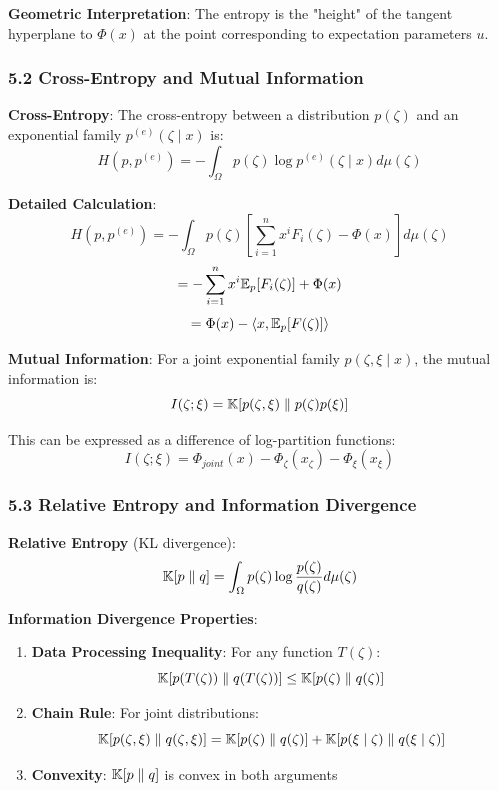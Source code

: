 \documentclass{amsart}
\let\originalmathbb\mathbb
\renewcommand{\mathbb}[1]{%
    \ifstrequal{#1}{1}{\mathbbm{#1}}{\originalmathbb{#1}}%
}
\theoremstyle{plain}
\theoremstyle{definition}
\theoremstyle{remark}
\begin{document}
\textbf{Geometric Interpretation}: The entropy is the "height" of the tangent hyperplane to $\Phi(x)$ at the point corresponding to expectation parameters $u$.

\subsubsection{5.2 Cross-Entropy and Mutual Information}

\textbf{Cross-Entropy}:
The cross-entropy between a distribution $p(\zeta)$ and an exponential family $p^{(e)}(\zeta \mid x)$ is:
\[
H(p, p^{(e)}) = -\int_{\Omega} p(\zeta) \log p^{(e)}(\zeta \mid x) d\mu(\zeta)
\]

\textbf{Detailed Calculation}:
\[
H(p, p^{(e)}) = -\int_{\Omega} p(\zeta) \left[\sum_{i=1}^n x^i F_i(\zeta) - \Phi(x)\right] d\mu(\zeta)
\]
\[
= -\sum_{i=1}^n x^i \mathbb{E}_p[F_i(\zeta)] + \Phi(x)
\]
\[
= \Phi(x) - \langle x, \mathbb{E}_p[F(\zeta)] \rangle
\]

\textbf{Mutual Information}:
For a joint exponential family $p(\zeta, \xi \mid x)$, the mutual information is:
\[
I(\zeta; \xi) = \mathbb{K}[p(\zeta, \xi) \parallel p(\zeta)p(\xi)]
\]

This can be expressed as a difference of log-partition functions:
\[
I(\zeta; \xi) = \Phi_{joint}(x) - \Phi_{\zeta}(x_{\zeta}) - \Phi_{\xi}(x_{\xi})
\]

\subsubsection{5.3 Relative Entropy and Information Divergence}

\textbf{Relative Entropy} (KL divergence):
\[
\mathbb{K}[p \parallel q] = \int_{\Omega} p(\zeta) \log \frac{p(\zeta)}{q(\zeta)} d\mu(\zeta)
\]

\textbf{Information Divergence Properties}:

\begin{enumerate}
	\item \textbf{Data Processing Inequality}: For any function $T(\zeta)$:
\[
\mathbb{K}[p(T(\zeta)) \parallel q(T(\zeta))] \leq \mathbb{K}[p(\zeta) \parallel q(\zeta)]
\]
	\item \textbf{Chain Rule}: For joint distributions:
\[
\mathbb{K}[p(\zeta, \xi) \parallel q(\zeta, \xi)] = \mathbb{K}[p(\zeta) \parallel q(\zeta)] + \mathbb{K}[p(\xi \mid \zeta) \parallel q(\xi \mid \zeta)]
\]
	\item \textbf{Convexity}: $\mathbb{K}[p \parallel q]$ is convex in both arguments
\end{enumerate}
\end{document}
